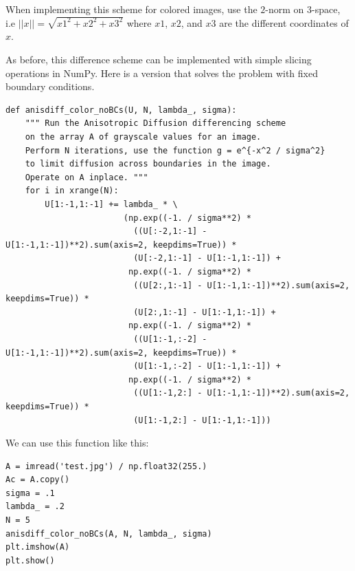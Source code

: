 When implementing this scheme for colored images, use the $2$-norm on 3-space, i.e $||x||=\sqrt{x1^2+x2^2+x3^2}$ where $x1$, $x2$, and $x3$ are the different coordinates of $x$.

As before, this difference scheme can be implemented with simple slicing operations in NumPy.
Here is a version that solves the problem with fixed boundary conditions.
\begin{lstlisting}
def anisdiff_color_noBCs(U, N, lambda_, sigma):
    """ Run the Anisotropic Diffusion differencing scheme
    on the array A of grayscale values for an image.
    Perform N iterations, use the function g = e^{-x^2 / sigma^2}
    to limit diffusion across boundaries in the image.
    Operate on A inplace. """
    for i in xrange(N):
        U[1:-1,1:-1] += lambda_ * \
                        (np.exp((-1. / sigma**2) *
                          ((U[:-2,1:-1] - U[1:-1,1:-1])**2).sum(axis=2, keepdims=True)) *
                          (U[:-2,1:-1] - U[1:-1,1:-1]) +
                         np.exp((-1. / sigma**2) *
                          ((U[2:,1:-1] - U[1:-1,1:-1])**2).sum(axis=2, keepdims=True)) *
                          (U[2:,1:-1] - U[1:-1,1:-1]) +
                         np.exp((-1. / sigma**2) *
                          ((U[1:-1,:-2] - U[1:-1,1:-1])**2).sum(axis=2, keepdims=True)) *
                          (U[1:-1,:-2] - U[1:-1,1:-1]) +
                         np.exp((-1. / sigma**2) *
                          ((U[1:-1,2:] - U[1:-1,1:-1])**2).sum(axis=2, keepdims=True)) *
                          (U[1:-1,2:] - U[1:-1,1:-1]))
\end{lstlisting}
We can use this function like this:
\begin{lstlisting}
A = imread('test.jpg') / np.float32(255.)
Ac = A.copy()
sigma = .1
lambda_ = .2
N = 5
anisdiff_color_noBCs(A, N, lambda_, sigma)
plt.imshow(A)
plt.show()
\end{lstlisting}

